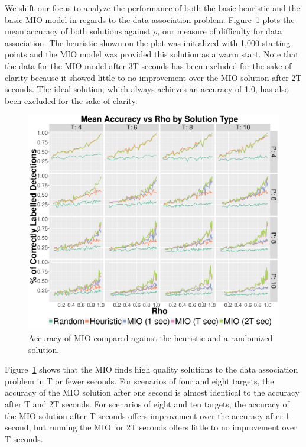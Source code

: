 We shift our focus to analyze the performance of both the basic heuristic and the basic MIO model in regards to the data association problem. Figure~\ref{fig:Basic_Accuracy_Summary} plots the mean accuracy of both solutions against $\rho$, our measure of difficulty for data association. The heuristic shown on the plot was initialized with 1,000 starting points and the MIO model was provided this solution as a warm start. Note that the data for the MIO model after 3T seconds has been excluded for the sake of clarity because it showed little to no improvement over the MIO solution after 2T seconds. The ideal solution, which always achieves an accuracy of 1.0, has also been excluded for the sake of clarity.
\begin{figure}[ht]
  \centering  
  \includegraphics[width=\columnwidth]{../Figures/Basic_Accuracy_Summary}
  \caption{Accuracy of MIO compared against the heuristic and a randomized solution.}
  \label{fig:Basic_Accuracy_Summary}
\end{figure}

Figure~\ref{fig:Basic_Accuracy_Summary} shows that the MIO finds high quality solutions to the data association problem in T or fewer seconds. For scenarios of four and eight targets, the accuracy of the MIO solution after one second is almost identical to the accuracy after T and 2T seconds. For scenarios of eight and ten targets, the accuracy of the MIO solution after T seconds offers improvement over the accuracy after 1 second, but running the MIO for 2T seconds offers little to no improvement over T seconds. 

